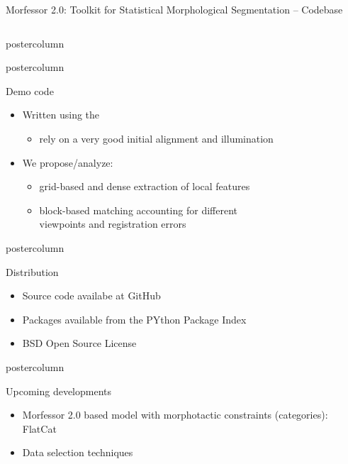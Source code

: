 \documentclass[final]{beamer} %
\begin{document}
\begin{frame}{Morfessor 2.0: Toolkit for Statistical Morphological Segmentation -- Codebase}
\begin{columns}
\begin{column}{.3\textwidth}
\begin{beamercolorbox}[center,wd=\textwidth]{postercolumn}
	\end{beamercolorbox}


  \begin{beamercolorbox}[center,wd=\textwidth]{postercolumn}
 \begin{block}{Demo code}
              \begin{itemize}
              \item Written using the 
                \begin{itemize}
                \item rely on a very good initial alignment and illumination
                \end{itemize}
              \item We propose/analyze:
                \begin{itemize}
                \item grid-based and dense extraction of local features
                \item block-based matching accounting for different\\
	                  viewpoints and registration errors
                \end{itemize}
              \end{itemize}              
            \end{block}
            
	\end{beamercolorbox}



  \begin{beamercolorbox}[center,wd=\textwidth]{postercolumn}
 \begin{block}{Distribution}
              \begin{itemize}
              \item Source code availabe at GitHub
		\item Packages available from the PYthon Package Index
              \item BSD Open Source License
\end{itemize}
            \end{block}
            
	\end{beamercolorbox}


  \begin{beamercolorbox}[center,wd=\textwidth]{postercolumn}
 \begin{block}{Upcoming developments}
              \begin{itemize}
		\item Morfessor 2.0 based model with morphotactic constraints (categories): FlatCat 
              \item Data selection techniques
		

\end{itemize}
\end{block}
\end{beamercolorbox}
\end{column}
\end{columns}
\end{frame}
\end{document}
